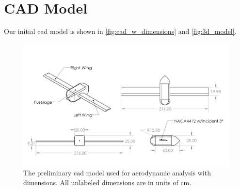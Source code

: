 \chapter{CAD Model}\label{cp:cad}

Our initial \acrfull{cad} model is shown in \autoref{fig:cad_w_dimensions} and \autoref{fig:3d_model}.

\begin{figure}[htpb]
    \centering
    \includegraphics[width=\linewidth]{Figures/FuselageAirfoilAssemDraw.JPG}
    \caption[\acrshort{cad} model with dimensions]{The preliminary \acrshort{cad} model used for aerodynamic analysis with dimensions. All unlabeled dimensions are in units of \unit{\centi\meter}.}
    \label{fig:cad_w_dimensions}
\end{figure}

